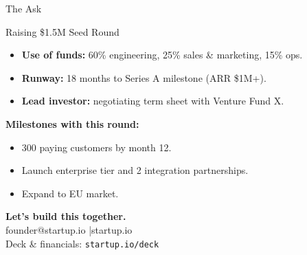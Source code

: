 \documentclass[aspectratio=169]{beamer}
\begin{document}
\begin{frame}{The Ask}
  \begin{block}{Raising \$1.5M Seed Round}
    \begin{itemize}
      \item \textbf{Use of funds:} 60\% engineering, 25\% sales \& marketing, 15\% ops.
      \item \textbf{Runway:} 18 months to Series A milestone (ARR \$1M+).
      \item \textbf{Lead investor:} negotiating term sheet with Venture Fund X.
    \end{itemize}
  \end{block}

  \vspace{0.8em}
  \textbf{Milestones with this round:}
  \begin{itemize}
    \item 300 paying customers by month 12.
    \item Launch enterprise tier and 2 integration partnerships.
    \item Expand to EU market.
  \end{itemize}
\end{frame}

\begin{frame}[plain]
  \centering
  \vfill
  {\Large\bfseries Let's build this together.}\\[1em]
  {\normalsize founder@startup.io \quad|\quad startup.io}\\[0.5em]
  {\small Deck \& financials: \texttt{startup.io/deck}}
  \vfill
\end{frame}
\end{document}
